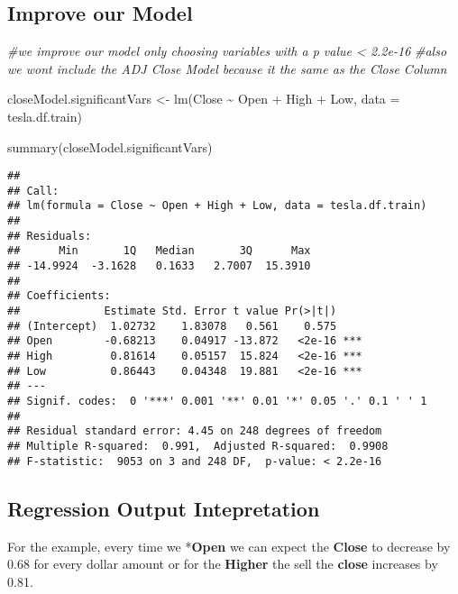\documentclass[
]{article}
\newenvironment{Shaded}{\begin{snugshade}}{\end{snugshade}}
\newcommand{\AttributeTok}[1]{\textcolor[rgb]{0.77,0.63,0.00}{#1}}
\newcommand{\CommentTok}[1]{\textcolor[rgb]{0.56,0.35,0.01}{\textit{#1}}}
\newcommand{\FunctionTok}[1]{\textcolor[rgb]{0.00,0.00,0.00}{#1}}
\newcommand{\NormalTok}[1]{#1}
\newcommand{\OtherTok}[1]{\textcolor[rgb]{0.56,0.35,0.01}{#1}}
\newcommand{\SpecialCharTok}[1]{\textcolor[rgb]{0.00,0.00,0.00}{#1}}
\begin{document}
\hypertarget{improve-our-model}{%
\subsection{Improve our Model}\label{improve-our-model}}

\begin{Shaded}
\begin{Highlighting}[]
\CommentTok{\#we improve our model only choosing variables with a p value \textless{} 2.2e{-}16}
\CommentTok{\#also we won\textquotesingle{}t include the ADJ Close Model because it the same as the Close Column}

\NormalTok{closeModel.significantVars }\OtherTok{\textless{}{-}} \FunctionTok{lm}\NormalTok{(Close }\SpecialCharTok{\textasciitilde{}}\NormalTok{ Open }\SpecialCharTok{+}\NormalTok{ High }\SpecialCharTok{+}\NormalTok{ Low, }\AttributeTok{data =}\NormalTok{ tesla.df.train)}

\FunctionTok{summary}\NormalTok{(closeModel.significantVars)}
\end{Highlighting}
\end{Shaded}

\begin{verbatim}
## 
## Call:
## lm(formula = Close ~ Open + High + Low, data = tesla.df.train)
## 
## Residuals:
##      Min       1Q   Median       3Q      Max 
## -14.9924  -3.1628   0.1633   2.7007  15.3910 
## 
## Coefficients:
##             Estimate Std. Error t value Pr(>|t|)    
## (Intercept)  1.02732    1.83078   0.561    0.575    
## Open        -0.68213    0.04917 -13.872   <2e-16 ***
## High         0.81614    0.05157  15.824   <2e-16 ***
## Low          0.86443    0.04348  19.881   <2e-16 ***
## ---
## Signif. codes:  0 '***' 0.001 '**' 0.01 '*' 0.05 '.' 0.1 ' ' 1
## 
## Residual standard error: 4.45 on 248 degrees of freedom
## Multiple R-squared:  0.991,  Adjusted R-squared:  0.9908 
## F-statistic:  9053 on 3 and 248 DF,  p-value: < 2.2e-16
\end{verbatim}

\hypertarget{regression-output-intepretation}{%
\subsection{Regression Output
Intepretation}\label{regression-output-intepretation}}

For the example, every time we *\textbf{Open} we can expect the
\textbf{Close} to decrease by 0.68 for every dollar amount or for the
\textbf{Higher} the sell the \textbf{close} increases by 0.81.
\end{document}
